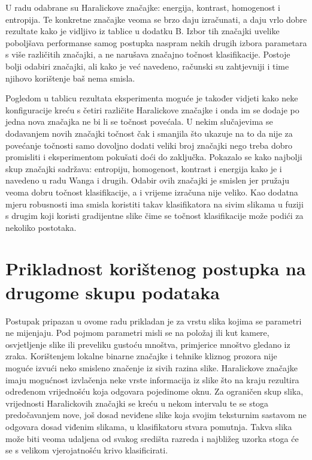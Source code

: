 \documentclass[times, utf8, zavrsni, numeric]{fer}
\begin{document}
\bigbreak

U radu \citep{6266412} odabrane su Haralickove značajke: energija, kontrast,
homogenost i entropija. Te konkretne značajke veoma se brzo daju izračunati, a daju 
vrlo dobre rezultate kako je vidljivo iz tablice u dodatku B. Izbor tih značajki uvelike poboljšava
performanse samog postupka naspram nekih drugih izbora parametara s više različitih značajki, a
ne narušava značajno točnost klasifikacije. Postoje bolji odabiri značajki, ali kako je već navedeno, 
računski su zahtjevniji i time njihovo korištenje baš nema smisla. 

\bigbreak

Pogledom u tablicu rezultata eksperimenta moguće je također vidjeti kako neke konfiguracije 
kreću s četiri različite Haralickove značajke i onda im se dodaje po jedna nova značajka ne bi
li se točnost povećala. U nekim slučajevima se dodavanjem novih značajki točnost čak i smanjila
što ukazuje na to da nije za povećanje točnosti samo dovoljno dodati veliki broj značajki nego 
treba dobro promisliti i eksperimentom pokušati doći do zaključka. Pokazalo se kako najbolji skup
značajki sadržava: entropiju, homogenost, kontrast i energija kako je i navedeno u radu Wanga i drugih.
Odabir ovih značajki je smislen jer pružaju veoma dobru točnost klasifikacije, a i 
vrijeme izračuna nije veliko. Kao dodatna mjeru robusnosti ima smisla koristiti takav klasifikatora na sivim
slikama u fuziji s drugim koji koristi gradijentne slike čime se točnost klasifikacije može podići
za nekoliko postotaka.


\chapter{Prikladnost korištenog postupka na drugome skupu podataka}

Postupak pripazan u ovome radu prikladan je za vrstu slika kojima se parametri ne mijenjaju. Pod 
pojmom parametri misli se na položaj ili kut kamere, osvjetljenje slike ili preveliku gustoću mnoštva, 
primjerice mnoštvo gledano iz zraka. Korištenjem lokalne binarne značajke i tehnike kliznog prozora
nije moguće izvući neko smisleno značenje iz sivih razina slike. Haralickove značajke imaju
mogućnost izvlačenja neke vrste informacija iz slike što na kraju rezultira određenom vrijednošću
koja odgovara pojedinome oknu. Za ograničen skup slika, vrijednosti Haralickovih značajki 
se kreću u nekom intervalu te se stoga predočavanjem nove, još dosad neviđene slike koja
svojim teksturnim sastavom ne odgovara dosad viđenim slikama, u klasifikatoru stvara pomutnja.
Takva slika može biti veoma udaljena od svakog središta razreda i najbližeg uzorka stoga 
će se s velikom vjerojatnošću krivo klasificirati. 
\end{document}
